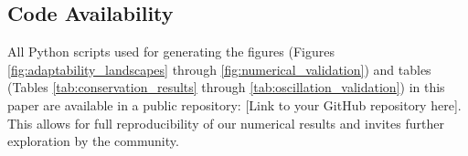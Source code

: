 \documentclass[11pt,a4paper]{article}
\begin{document}
\subsection*{Code Availability}
All Python scripts used for generating the figures (Figures \ref{fig:adaptability_landscapes} through \ref{fig:numerical_validation}) and tables (Tables \ref{tab:conservation_results} through \ref{tab:oscillation_validation}) in this paper are available in a public repository: [Link to your GitHub repository here]. This allows for full reproducibility of our numerical results and invites further exploration by the community.



\end{document}
